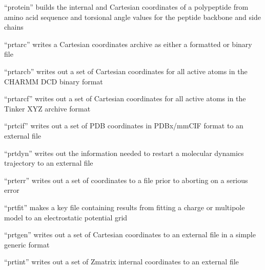 \documentclass[letterpaper,11pt,english]{sphinxmanual}
\begin{document}
\sphinxAtStartPar
“protein” builds the internal and Cartesian coordinates of a polypeptide from amino acid sequence and torsional angle values for the peptide backbone and side chains

\sphinxAtStartPar
{}

\sphinxAtStartPar
“prtarc” writes a Cartesian coordinates archive as either a formatted or binary file

\sphinxAtStartPar
{}

\sphinxAtStartPar
“prtarcb” writes out a set of Cartesian coordinates for all active atoms in the CHARMM DCD binary format

\sphinxAtStartPar
{}

\sphinxAtStartPar
“prtarcf” writes out a set of Cartesian coordinates for all active atoms in the Tinker XYZ archive format

\sphinxAtStartPar
{}

\sphinxAtStartPar
“prtcif” writes out a set of PDB coordinates in PDBx/mmCIF format to an external file

\sphinxAtStartPar
{}

\sphinxAtStartPar
“prtdyn” writes out the information needed to restart a molecular dynamics trajectory to an external file

\sphinxAtStartPar
{}

\sphinxAtStartPar
“prterr” writes out a set of coordinates to a file prior to aborting on a serious error

\sphinxAtStartPar
{}

\sphinxAtStartPar
“prtfit” makes a key file containing results from fitting a charge or multipole model to an electrostatic potential grid

\sphinxAtStartPar
{}

\sphinxAtStartPar
“prtgen” writes out a set of Cartesian coordinates to an external file in a simple generic format

\sphinxAtStartPar
{}

\sphinxAtStartPar
“prtint” writes out a set of Z\sphinxhyphen{}matrix internal coordinates to an external file

\sphinxAtStartPar
{}
\end{document}
